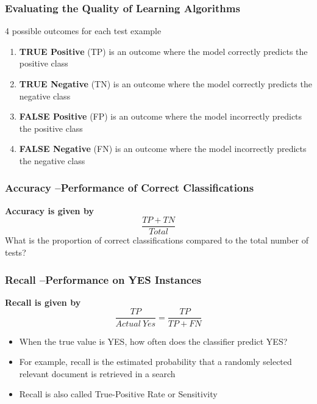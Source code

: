 \documentclass[conference]{styles/acmsiggraph}
\begin{document}
        \subsubsection{Evaluating the Quality of Learning Algorithms}
            4 possible outcomes for each test example
            \begin{enumerate}
                \item \textbf{TRUE Positive} (TP)\newline 
                is an outcome where the model correctly predicts the positive class
                \item \textbf{TRUE Negative} (TN)\newline 
                is an outcome where the model correctly predicts the negative class
                \item \textbf{FALSE Positive} (FP)\newline 
                is an outcome where the model incorrectly predicts the positive class
                \item \textbf{FALSE Negative} (FN)\newline 
                is an outcome where the model incorrectly predicts the negative class
            \end{enumerate}
        
        \subsubsection{Accuracy –Performance of Correct Classifications}
            \textbf{Accuracy is given by} $$\frac{TP + TN}{Total}$$
            What is the proportion of correct classifications compared to the total number of tests?
        
        \subsubsection{Recall –Performance on YES Instances}
            \textbf{Recall is given by} $$\frac{TP}{Actual\ Yes} = \frac{TP}{TP + FN}$$
            \begin{itemize}
                \item When the true value is YES, how often does the classifier predict YES?
                \item For example, recall is the estimated probability that a randomly selected relevant document is retrieved in a search
                \item Recall is also called True-Positive Rate or Sensitivity
            \end{itemize}
        
\end{document}

